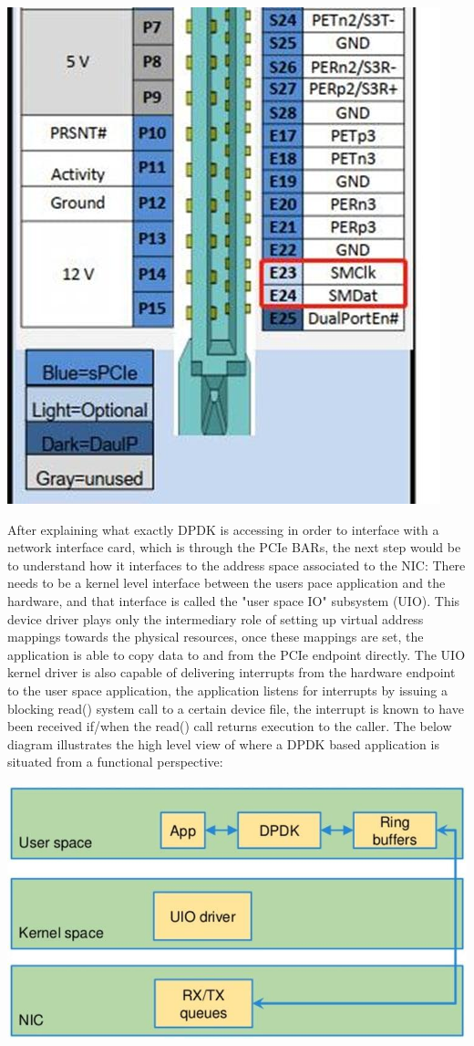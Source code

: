 \documentclass[a4paper,12p,titlepage]{article}
\begin{document}
\includegraphics[width=\textwidth]{connector}

After explaining what exactly DPDK is accessing in order to interface with a network interface card, which is through the PCIe BARs, the next step would be to understand how it interfaces to the address space associated to the NIC: There needs to be a kernel level interface between the users pace application and the hardware, and that interface is called the "user space IO" subsystem (UIO). This device driver plays only the intermediary role of setting up virtual address mappings towards the physical resources, once these mappings are set, the application is able to copy data to and from the PCIe endpoint directly. The UIO kernel driver is also capable of delivering interrupts from the hardware endpoint to the user space application, the application listens for interrupts by issuing a blocking read() system call to a certain device file, the interrupt is known to have been received if/when the read() call returns execution to the caller. The below diagram illustrates the high level view of where a DPDK based application is situated from a functional perspective:

\includegraphics[width=\textwidth]{dpdkstack}
\end{document}
